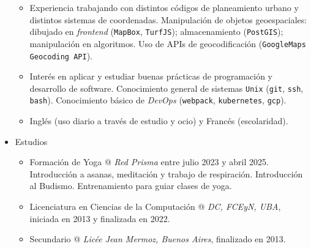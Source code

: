 \documentclass[a4paper]{article}
\begin{document}
\begin{itemize}
\begin{itemize}
    \item
      Experiencia trabajando con distintos códigos de planeamiento urbano y
      distintos sistemas de coordenadas.
      Manipulación de objetos geoespaciales: dibujado en \textit{frontend}
      (\texttt{MapBox}, \texttt{TurfJS}); almacenamiento (\texttt{PostGIS});
      manipulación en algoritmos. \newline
      Uso de APIs de geocodificación (\texttt{GoogleMaps Geocoding API}).

    \item
      Interés en aplicar y estudiar buenas prácticas de programación y
      desarrollo de software. \newline
      Conocimiento general de sistemas \texttt{Unix} (\texttt{git},
      \texttt{ssh}, \texttt{bash}).
      Conocimiento básico de \textit{DevOps} (\texttt{webpack},
      \texttt{kubernetes}, \texttt{gcp}).

    \item
      Inglés (uso diario a través de estudio y ocio) y Francés (escolaridad).

  \end{itemize}

  \item Estudios
  \begin{itemize}
    \item
      Formación de Yoga @ \textit{Red Prisma} entre julio 2023 y abril 2025.
		  \newline
	  Introducción a asanas, meditación y trabajo de respiración. \newline
	  Introducción al Budismo. \newline
	  Entrenamiento para guiar clases de yoga.

    \item
      Licenciatura en Ciencias de la Computación @ \textit{DC, FCEyN, UBA},
      iniciada en 2013 y finalizada en 2022.

    \item
      Secundario @ \textit{Licée Jean Mermoz, Buenos Aires}, finalizado en
      2013.

  \end{itemize}

\end{itemize}
\end{document}
